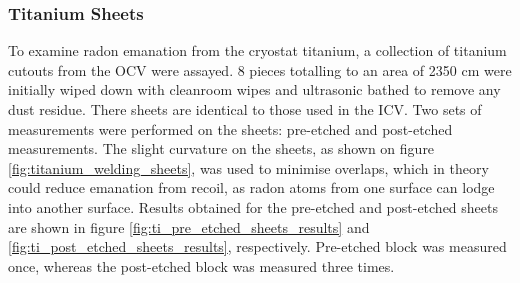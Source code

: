 \subsubsection{Titanium Sheets}

To examine radon emanation from the cryostat titanium, a collection of titanium cutouts from the OCV were assayed. 8 pieces totalling to an area of 2350 cm\squared{} were initially wiped down with cleanroom wipes and ultrasonic bathed to remove any dust residue. There sheets are identical to those used in the ICV. Two sets of measurements were performed on the sheets: pre-etched and post-etched measurements. The slight curvature on the sheets, as shown on figure \ref{fig:titanium_welding_sheets}, was used to minimise overlaps, which in theory could reduce emanation from recoil, as radon atoms from one surface can lodge into another surface. Results obtained for the pre-etched and post-etched sheets are shown in figure \ref{fig:ti_pre_etched_sheets_results} and \ref{fig:ti_post_etched_sheets_results}, respectively. Pre-etched block was measured once, whereas the post-etched block was measured three times.
%

